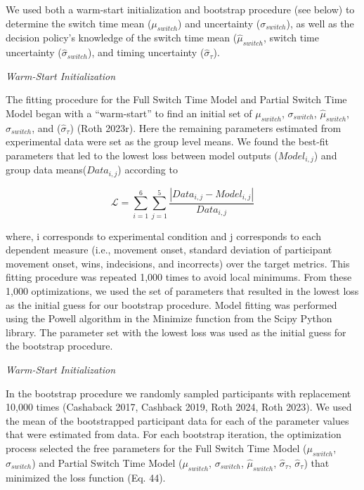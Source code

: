 \documentclass[12pt,letterpaper]{article}
\begin{document}
We used both a warm-start initialization and bootstrap procedure (see below) to determine the switch time mean ($\mu_{switch}$) and uncertainty ($\sigma_{switch}$), as well as the decision policy’s knowledge of the switch time mean ($\hat{\mu}_{switch}$, switch time uncertainty ($\hat{\sigma}_{switch}$), and timing uncertainty ($\hat{\sigma}_{\tau}$).

\noindent\emph{Warm-Start Initialization}

\noindent The fitting procedure for the Full Switch Time Model and Partial Switch Time Model began with a “warm-start” to find an initial set of $\mu_{switch}$, $\sigma_{switch}$, $\hat{\mu}_{switch}$, $\hat{\sigma}_{switch}$, and ($\hat{\sigma}_{\tau}$) (Roth 2023r).  Here the remaining parameters estimated from experimental data were set as the group level means. We found the best-fit parameters that led to the lowest loss between model outputs ($Model_{i,j}$) and group data means($Data_{i,j}$) according to

\begin{equation}
    \mathcal{L} = \sum_{i = 1}^{6} \sum_{j = 1}^{5} \frac{|Data_{i,j} - Model_{i,j}|}{Data_{i,j}}
\end{equation}

where, i corresponds to experimental condition and j corresponds to each dependent measure (i.e., movement onset, standard deviation of participant movement onset, wins, indecisions, and incorrects) over the target metrics. This fitting procedure was repeated 1,000 times to avoid local minimums. From these 1,000 optimizations, we used the set of parameters that resulted in the lowest loss as the initial guess for our bootstrap procedure. Model fitting was performed using the Powell algorithm in the Minimize function from the Scipy Python library. The parameter set with the lowest loss was used as the initial guess for the bootstrap procedure.

\noindent\emph{Warm-Start Initialization}

\noindent In the bootstrap procedure we randomly sampled participants with replacement 10,000 times (Cashaback 2017, Cashback 2019, Roth 2024, Roth 2023). We used the mean of the bootstrapped participant data for each of the parameter values that were estimated from data. For each bootstrap iteration, the optimization process selected the free parameters for the Full Switch Time Model ($\mu_{switch}$, $\sigma_{switch}$) and Partial Switch Time Model ($\mu_{switch}$, $\sigma_{switch}$, $\hat{\mu}_{switch}$, $\hat{\sigma}_{\tau}$, $\hat{\sigma}_{\tau}$) that minimized the loss function (Eq. 44).
\end{document}
